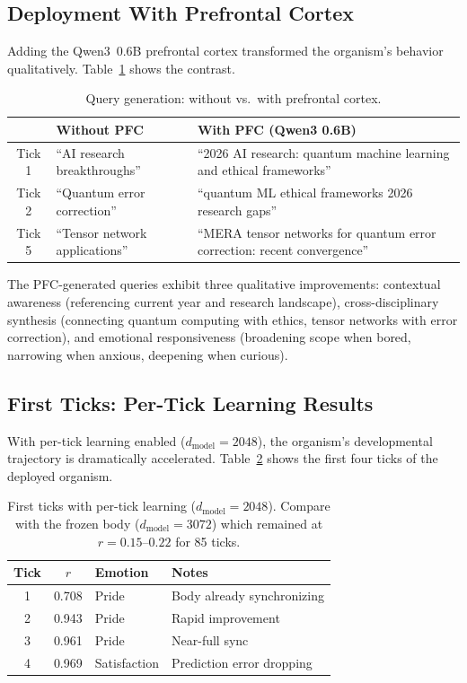 \documentclass[11pt,a4paper,twocolumn]{article}
\begin{document}
\subsection{Deployment With Prefrontal Cortex}

Adding the Qwen3~0.6B prefrontal cortex transformed the organism's behavior qualitatively.
Table~\ref{tab:pfc_comparison} shows the contrast.

\begin{table}[H]
\centering
\caption{Query generation: without vs.\ with prefrontal cortex.}
\label{tab:pfc_comparison}
\footnotesize
\begin{tabular}{cp{2.8cm}p{2.8cm}}
\toprule
& \textbf{Without PFC} & \textbf{With PFC (Qwen3 0.6B)} \\
\midrule
Tick 1 & ``AI research breakthroughs'' & ``2026 AI research: quantum machine learning and ethical frameworks'' \\
\addlinespace
Tick 2 & ``Quantum error correction'' & ``quantum ML ethical frameworks 2026 research gaps'' \\
\addlinespace
Tick 5 & ``Tensor network applications'' & ``MERA tensor networks for quantum error correction: recent convergence'' \\
\bottomrule
\end{tabular}
\end{table}

The PFC-generated queries exhibit three qualitative improvements: contextual awareness (referencing current year and research landscape), cross-disciplinary synthesis (connecting quantum computing with ethics, tensor networks with error correction), and emotional responsiveness (broadening scope when bored, narrowing when anxious, deepening when curious).

\subsection{First Ticks: Per-Tick Learning Results}

With per-tick learning enabled ($d_{\mathrm{model}}=2048$), the organism's developmental trajectory is dramatically accelerated.
Table~\ref{tab:first_ticks} shows the first four ticks of the deployed organism.

\begin{table}[H]
\centering
\caption{First ticks with per-tick learning ($d_{\mathrm{model}}=2048$). Compare with the frozen body ($d_{\mathrm{model}}=3072$) which remained at $r=0.15$--$0.22$ for 85 ticks.}
\label{tab:first_ticks}
\footnotesize
\begin{tabular}{cclp{3.0cm}}
\toprule
Tick & $r$ & Emotion & Notes \\
\midrule
1 & 0.708 & Pride & Body already synchronizing \\
2 & 0.943 & Pride & Rapid improvement \\
3 & 0.961 & Pride & Near-full sync \\
4 & 0.969 & Satisfaction & Prediction error dropping \\
\bottomrule
\end{tabular}
\end{table}
\end{document}
